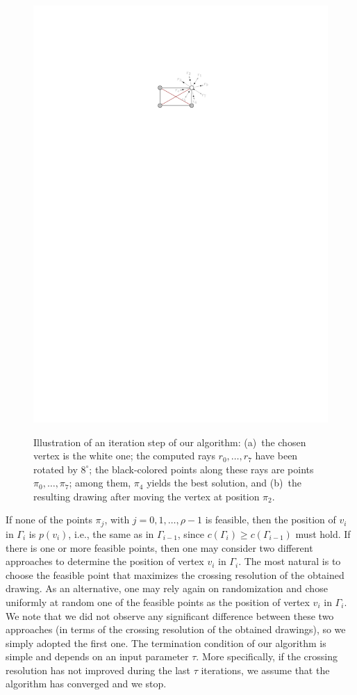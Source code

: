 \documentclass{comjnl}
\begin{document}
\begin{figure}[t!]
{	\includegraphics[page=2]{figures/algorithm}}
	\caption{%
	Illustration of an iteration step of our algorithm:
	(a)~the chosen vertex is the white one;
	the computed rays $r_0,\ldots,r_7$ have been rotated by $8^\circ$;
	the black-colored points along these rays are points $\pi_0,\ldots,\pi_7$;
	among them, $\pi_4$ yields the best solution, and
	(b)~the resulting drawing after moving the vertex at position $\pi_2$.}
	\label{fig:algo}
\end{figure}

If none of the points $\pi_j$, with $j=0,1,\ldots,\rho-1$ is feasible, then the position of $v_i$ in $\Gamma_i$ is $p(v_i)$, i.e., the same as in $\Gamma_{i-1}$, since $c(\Gamma_i) \geq c(\Gamma_{i-1})$ must hold. If there is one or more feasible points, then one may consider two different approaches to determine the position of vertex $v_i$ in $\Gamma_i$. The most natural is to choose the feasible point that maximizes the crossing resolution of the obtained drawing. As an alternative, one may rely again on randomization and chose uniformly at random one of the feasible points as the position of vertex $v_i$ in $\Gamma_i$. We note that we did not observe any significant difference between these two approaches (in terms of the crossing resolution of the obtained drawings), so we simply adopted the first one. The termination condition of our algorithm is simple and depends on an input parameter $\tau$. More specifically, if the crossing resolution has not improved during the last $\tau$ iterations, we assume that the algorithm has converged and we stop.
\end{document}
